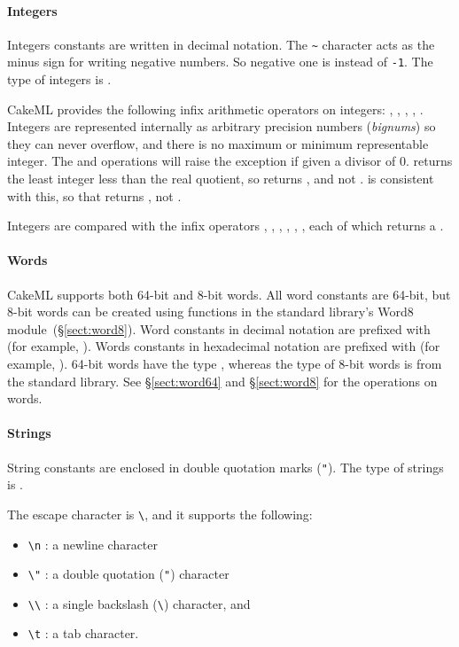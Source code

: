 \documentclass[12pt,a4paper]{book}
\begin{document}
\paragraph{Integers} Integers constants are written in decimal notation. The
\texttt{\textasciitilde} character acts as the minus sign for writing negative
numbers. So negative one is  instead of \texttt{-1}. The type of integers is
.

CakeML provides the following infix arithmetic operators on integers: \smlinline{+}, \smlinline{-}, \smlinline{*}, , . Integers are represented internally as arbitrary precision numbers (\emph{bignums}) so they can never overflow, and there is no maximum or minimum representable integer. The  and  operations will raise the  exception if given a divisor of 0.  returns the least integer less than the real quotient, so  returns , and not .  is consistent with this, so that  returns , not .

Integers are compared with the infix operators \smlinline{=}, \smlinline{<>}, \smlinline{<}, \smlinline{>}, \smlinline{<=}, \smlinline{>=}, each of which returns a .

\paragraph{Words} CakeML supports both 64-bit and 8-bit words. All word
constants are 64-bit, but 8-bit words can be created using functions in the
standard library's Word8 module~(\S\ref{sect:word8}). Word constants in decimal
notation are prefixed with  (for example, ).
Words constants in hexadecimal notation are prefixed with  (for
example, ). 64-bit words have the type , whereas
the type of 8-bit words is  from the standard library.
See \S\ref{sect:word64} and \S\ref{sect:word8} for the operations on words.

\paragraph{Strings} String constants are enclosed in double quotation marks (\texttt{"}). The type of strings is .

The escape character is \verb|\|, and it supports the following:
\begin{itemize}
\item
\verb|\n| : a newline character
\item
\verb|\"| : a double quotation (\texttt{"}) character
\item
\verb|\\| : a single backslash (\verb|\|) character, and
\item
\verb|\t| : a tab character.
\end{itemize}
\end{document}
